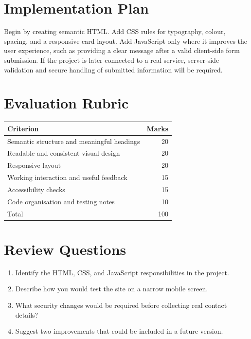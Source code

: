 \documentclass[11pt,openany,oneside]{book}
\begin{document}
\section{Implementation Plan}
Begin by creating semantic HTML. Add CSS rules for typography, colour, spacing, and a responsive card layout. Add JavaScript only where it improves the user experience, such as providing a clear message after a valid client-side form submission. If the project is later connected to a real service, server-side validation and secure handling of submitted information will be required.

\section{Evaluation Rubric}
\begin{tabularx}{\textwidth}{p{}r}
\toprule
Criterion & Marks\\
\midrule
Semantic structure and meaningful headings & 20\\
Readable and consistent visual design & 20\\
Responsive layout & 20\\
Working interaction and useful feedback & 15\\
Accessibility checks & 15\\
Code organisation and testing notes & 10\\
\midrule
Total & 100\\
\bottomrule
\end{tabularx}

\section*{Review Questions}
\begin{enumerate}
\item Identify the HTML, CSS, and JavaScript responsibilities in the project.
\item Describe how you would test the site on a narrow mobile screen.
\item What security changes would be required before collecting real contact details?
\item Suggest two improvements that could be included in a future version.
\end{enumerate}
\end{document}
